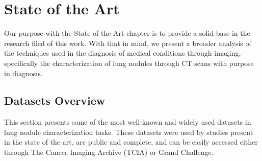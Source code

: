 




\chapter{State of the Art}\label{chap:sota}
Our purpose with the State of the Art chapter is to provide a solid base in the research filed of this work. With that in mind, we present a broader analysis of the techniques used in the diagnosis of medical conditions through imaging, specifically the characterization of lung nodules through CT scans with purpose in diagnosis.


\section{Datasets Overview}
This section presents some of the most well-known and widely used datasets in lung nodule characterization tasks. These datasets were used by studies present in the state of the art, are public and complete, and can be easily accessed either through The Cancer Imaging Archive (TCIA) or Grand Challenge.


